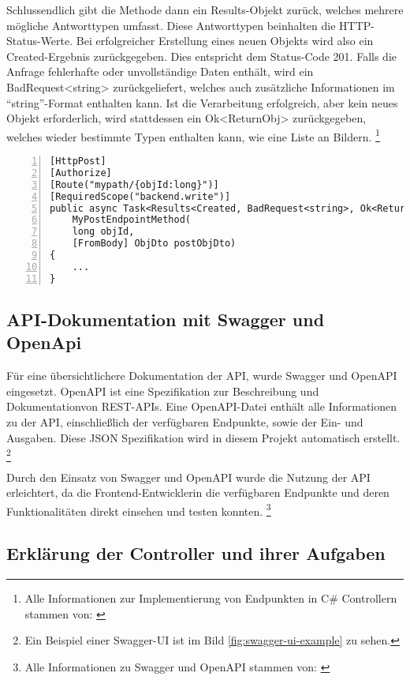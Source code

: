 Schlussendlich gibt die Methode dann ein Results-Objekt zurück, welches mehrere 
mögliche Antworttypen umfasst. Diese Antworttypen beinhalten die HTTP-Status-Werte.
Bei erfolgreicher Erstellung eines neuen Objekts wird also ein Created-Ergebnis zurückgegeben. 
Dies entspricht dem Status-Code 201. Falls die Anfrage fehlerhafte oder unvollständige Daten 
enthält, wird ein BadRequest<string> zurückgeliefert, welches auch zusätzliche Informationen
im ``string''-Format enthalten kann. Ist die Verarbeitung erfolgreich, aber kein neues Objekt 
erforderlich, wird stattdessen ein Ok<ReturnObj> zurückgegeben, welches wieder bestimmte
Typen enthalten kann, wie eine Liste an Bildern.
\footnote{Alle Informationen zur Implementierung von Endpunkten in C\# Controllern stammen von: \cite{MicrosoftCorporationaa} \cite{MicrosoftCorporationab}}

\begin{lstlisting}[numbers=left,caption={Beispiel eines Endpunkts},label={lst:endpoint-example}]
[HttpPost]
[Authorize]
[Route("mypath/{objId:long}")]
[RequiredScope("backend.write")]
public async Task<Results<Created, BadRequest<string>, Ok<ReturnObj>>> 
    MyPostEndpointMethod(
    long objId, 
    [FromBody] ObjDto postObjDto)
{
    ...
}
\end{lstlisting}

\subsection{API-Dokumentation mit Swagger und OpenApi}

Für eine übersichtlichere Dokumentation der API, wurde Swagger und OpenAPI eingesetzt.
OpenAPI ist eine Spezifikation zur Beschreibung und Dokumentationvon REST-APIs. Eine
OpenAPI-Datei enthält alle Informationen zu der API, einschließlich der verfügbaren 
Endpunkte, sowie der Ein- und Ausgaben. Diese JSON Spezifikation wird in diesem Projekt
automatisch erstellt.
\footnote{Ein Beispiel einer Swagger-UI ist im Bild \ref{fig:swagger-ui-example} zu sehen.}

Durch den Einsatz von Swagger und OpenAPI wurde die Nutzung der API erleichtert, 
da die Frontend-Entwicklerin die verfügbaren Endpunkte und deren Funktionalitäten direkt 
einsehen und testen konnten. 
\footnote{Alle Informationen zu Swagger und OpenAPI stammen von: \cite{SmartBearSoftware}}

\subsection{Erklärung der Controller und ihrer Aufgaben}

